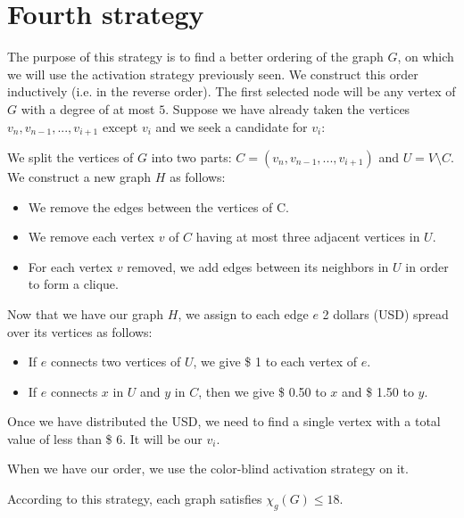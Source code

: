 \section{Fourth strategy}

The purpose of this strategy is to find a better ordering of the graph $G$, on which we will use the activation strategy previously seen. We construct this order inductively (i.e. in the reverse order). The first selected node will be any vertex of $G$ with a degree of at most $5$.
Suppose we have already taken the vertices $v_{n}, v_{n-1}, ..., v_{i+1}$ except $v_{i}$ and we seek a candidate for $v_{i}$:

We split the vertices of $G$ into two parts: $C = (v_{n}, v_{n-1}, ..., v_{i+1})$ and $U = V \setminus C$.
We construct a new graph $H$ as follows:
\begin{itemize}
\item We remove the edges between the vertices of C.
\item We remove each vertex $v$ of $C$ having at most three adjacent vertices in $U$.
\item For each vertex $v$ removed, we add edges between its neighbors in $U$ in order to form a clique.
\end{itemize}

Now that we have our graph $H$, we assign to each edge $e$ 2 dollars (USD) spread over its vertices as follows:
\begin{itemize}
\item If $e$ connects two vertices of $U$, we give \$ 1 to each vertex of $e$.
\item If $e$ connects $x$ in $U$ and $y$ in $C$, then we give \$ 0.50 to $x$ and \$ 1.50 to $y$.
\end{itemize}

Once we have distributed the USD, we need to find a single vertex with a total value of less than \$ 6.
It will be our $v_{i}$.

When we have our order, we use the color-blind activation strategy on it.

According to this strategy, each graph satisfies $\chi_{g}(G) \leq 18$.